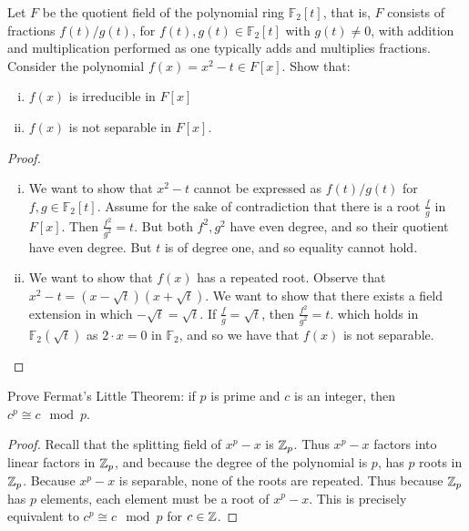 \documentclass[num=9,duedate=04-07-21,course=Algebra\ II,proflastname=Walton]{hwtemplate}
\begin{document}
\problem[5]
\begin{claim}
	Let \(F\) be the quotient field of the polynomial ring \(\mathbb{F}_2[t]\), that is, \(F\) consists of fractions \(f(t) / g(t)\), for \(f(t),g(t) \in \mathbb{F}_2[t]\) with \(g(t) \neq 0\), with addition and multiplication performed as one typically adds and multiplies fractions. Consider the polynomial \(f(x) = x^2-t \in F[x]\). Show that:
	\begin{enumerate}[(i).]
		\item \(f(x)\) is irreducible in \(F[x]\) 
		\item \(f(x)\) is not separable in \(F[x]\).
	\end{enumerate}
\end{claim}
\begin{proof}
	\begin{enumerate}[(i).]
		\item We want to show that \(x^2-t\) cannot be expressed as \(f(t) / g(t)\) for \(f,g \in \mathbb{F}_2[t]\). Assume for the sake of contradiction that there is a root \(\frac{f}{g}\) in \(F[x]\). Then \(\frac{f^2}{g^2}= t\). But both \(f^2,g^2\) have even degree, and so their quotient have even degree. But \(t\) is of degree one, and so equality cannot hold.
		\item We want to show that \(f(x)\) has a repeated root. Observe that \(x^2-t = (x-\sqrt{t})(x+\sqrt{t} )\). We want to show that there exists a field extension in which \(-\sqrt{t} =\sqrt{t} \). If \(\frac{f}{g}= \sqrt{t} \), then \(\frac{f^2}{g^2} = t\). which holds in \(\mathbb{F}_2(\sqrt{t} )\) as \(2\cdot x=0\) in \(\mathbb{F}_2\), and so we have that \(f(x)\) is not separable.
	\end{enumerate}
\end{proof}

\problem[6]
\begin{claim}
	Prove Fermat's Little Theorem: if \(p\) is prime and \(c\) is an integer, then \(c^{p}\cong c \mod p\). 
\end{claim}
\begin{proof}
	Recall that the splitting field of \(x^{p}-x\) is \(\mathbb{Z}_p\). Thus \(x^{p}-x\) factors into linear factors in \(\mathbb{Z}_p\), and because the degree of the polynomial is \(p\), has \(p\) roots in \(\mathbb{Z}_p\). Because \(x^{p}-x\) is separable, none of the roots are repeated. Thus because \(\mathbb{Z}_p\) has \(p\) elements, each element must be a root of \(x^{p}-x\). This is precisely equivalent to \(c^{p}\cong c \mod p\) for \(c \in \mathbb{Z}\).
\end{proof}
\end{document}
